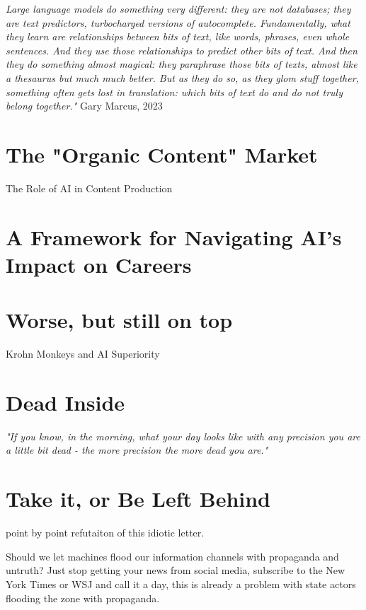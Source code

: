 \textit{Large language models do something very different: they are not databases; they are text predictors, turbocharged versions of autocomplete. Fundamentally, what they learn are relationships between bits of text, like words, phrases, even whole sentences. And they use those relationships to predict other bits of text. And then they do something almost magical: they paraphrase those bits of texts, almost like a thesaurus but much much better. But as they do so, as they glom stuff together, something often gets lost in translation: which bits of text do and do not truly belong together."} Gary Marcus, 2023 \cite{marcus2023}

\section{The "Organic Content" Market}

The Role of AI in Content Production

\section{A Framework for Navigating AI's Impact on Careers}

\section{Worse, but still on top}

Krohn Monkeys and AI Superiority \cite{KrohnTED}

\section{Dead Inside}

\textit{"If you know, in the morning, what your day looks like with any precision you are a little bit dead - the more precision the more dead you are."}\cite{procrustes}

\section{Take it, or Be Left Behind}

point by point refutaiton of this idiotic letter. \cite{dumbestletter}

Should we let machines flood our information channels with propaganda and untruth? Just stop getting your news from social media, subscribe to the New York Times or WSJ and call it a day, this is already a problem with state actors flooding the zone with propaganda.

